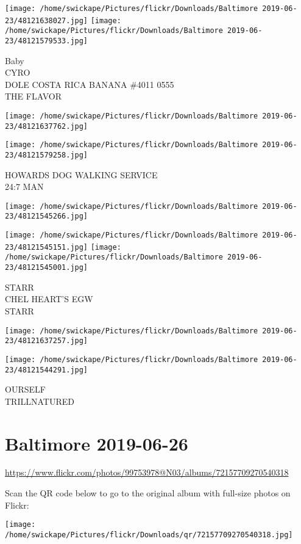 \documentclass[10pt,letterpaper]{article}
\begin{document}
\texttt{[image: /home/swickape/Pictures/flickr/Downloads/Baltimore 2019-06-23/48121638027.jpg]}
\texttt{[image: /home/swickape/Pictures/flickr/Downloads/Baltimore 2019-06-23/48121579533.jpg]}

Baby\\
CYRO\\
DOLE COSTA RICA BANANA \#4011 0555\\
THE FLAVOR
\pagebreak

\texttt{[image: /home/swickape/Pictures/flickr/Downloads/Baltimore 2019-06-23/48121637762.jpg]}

\vspace{0.25in}
\texttt{[image: /home/swickape/Pictures/flickr/Downloads/Baltimore 2019-06-23/48121579258.jpg]}

HOWARDS DOG WALKING SERVICE\\
24:7 MAN
\pagebreak

\texttt{[image: /home/swickape/Pictures/flickr/Downloads/Baltimore 2019-06-23/48121545266.jpg]}

\vspace{0.25in}
\texttt{[image: /home/swickape/Pictures/flickr/Downloads/Baltimore 2019-06-23/48121545151.jpg]}
\texttt{[image: /home/swickape/Pictures/flickr/Downloads/Baltimore 2019-06-23/48121545001.jpg]}

STARR\\
CHEL HEART'S EGW\\
STARR
\pagebreak

\texttt{[image: /home/swickape/Pictures/flickr/Downloads/Baltimore 2019-06-23/48121637257.jpg]}

\vspace{0.25in}
\texttt{[image: /home/swickape/Pictures/flickr/Downloads/Baltimore 2019-06-23/48121544291.jpg]}

OURSELF\\
TRILLNATURED
\pagebreak

\section*{Baltimore 2019-06-26}

\url{https://www.flickr.com/photos/99753978@N03/albums/72157709270540318}

Scan the QR code below to go to the original album with full-size photos on Flickr:

\texttt{[image: /home/swickape/Pictures/flickr/Downloads/qr/72157709270540318.jpg]}
\pagebreak
\end{document}
